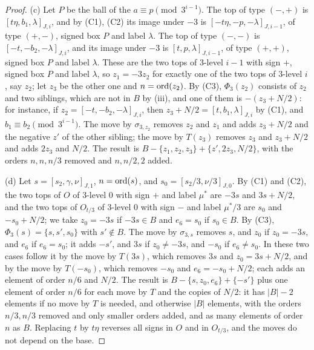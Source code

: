 \begin{proof}
(c) Let $P$ be the ball of the $a\equiv p\pmod{3^{i-1}}$. The top of type
$(-,+)$ is $[t\eta,b_{1},\lambda]_{J,i}$, and by (C1), (C2) its image under
$-3$ is $[-t\eta,-p,-\lambda]_{J,i-1}$, of type $(+,-)$, signed box $P$ and
label $\lambda$. The top of type $(-,-)$ is $[-t,-b_{2},-\lambda]_{J,i}$,
and its image under $-3$ is $[t,p,\lambda]_{J,i-1}$, of type $(+,+)$,
signed box $P$ and label $\lambda$. These are the two tops of $3$-level
$i-1$ with sign $+$, signed box $P$ and label $\lambda$, so $z_{1}=-3z_{2}$
for exactly one of the two tops of $3$-level $i$, say $z_{2}$; let $z_{3}$
be the other one and $n=\operatorname{ord}(z_{2})$. By (C3), $\Phi_{3}(z_{2})$ consists of
$z_{2}$ and two siblings, which are not in $B$ by
(iii), and one of them is $-(z_{3}+N/2)$: for instance,
if $z_{2}=[-t,-b_{2},-\lambda]_{J,i}$, then $z_{3}+N/2=[t,b_{1},\lambda]_{J,i}$
by (C1), and $b_{1}\equiv b_{2}\pmod{3^{i-1}}$. The move by
$\sigma_{3,z_{2}}$ removes $z_{2}$ and $z_{1}$ and adds $z_{3}+N/2$ and the
negative $z'$ of the other sibling; the move by $T(z_{3})$ removes $z_{3}$
and $z_{3}+N/2$ and adds $2z_{3}$ and $N/2$. The result is
$B-\{z_{1},z_{2},z_{3}\}+\{z',2z_{3},N/2\}$, with the orders $n,n,n/3$ removed
and $n,n/2,2$ added.

(d) Let $s=[s_{2},\gamma,\nu]_{J,1}$, $n=\operatorname{ord}(s)$, and
$s_{0}=[s_{2}/3,\nu/3]_{J,0}$. By (C1) and (C2), the two tops of $O$ of
$3$-level $0$ with sign $+$ and label $\mu^{*}$ are $-3s$ and $3s+N/2$, and
the two tops of $O_{t/3}$ of $3$-level $0$ with sign $-$ and label
$\mu^{*}/3$ are $s_{0}$ and $-s_{0}+N/2$; we take $z_{0}=-3s$ if $-3s\in B$
and $e_{6}=s_{0}$ if $s_{0}\in B$. By (C3), $\Phi_{3}(s)=\{s,s',s_{0}\}$ with
$s'\notin B$. The move by $\sigma_{3,s}$ removes $s$, and $z_{0}$ if
$z_{0}=-3s$, and $e_{6}$ if $e_{6}=s_{0}$; it adds $-s'$, and $3s$ if
$z_{0}\ne-3s$, and $-s_{0}$ if $e_{6}\ne s_{0}$. In these two cases follow it
by the move by $T(3s)$, which removes $3s$ and $z_{0}=3s+N/2$, and by the
move by $T(-s_{0})$, which removes $-s_{0}$ and $e_{6}=-s_{0}+N/2$; each adds
an element of order $n/6$ and $N/2$. The result is $B-\{s,z_{0},e_{6}\}+
\{-s'\}$ plus one element of order $n/6$ for each move by $T$ and the
copies of $N/2$: it has $|B|-2$ elements if no move by $T$ is needed, and
otherwise $|B|$ elements, with the orders $n/3,n/3$ removed and only smaller
orders added, and as many elements of order $n$ as $B$. Replacing $t$ by
$t\eta$ reverses all signs in $O$ and in $O_{t/3}$, and the moves do not
depend on the base.


\end{proof}
